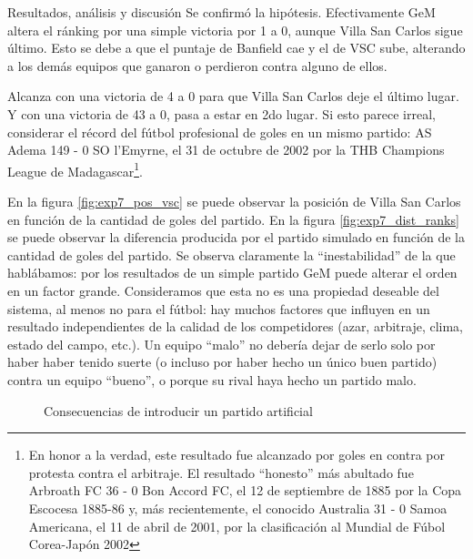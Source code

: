 \begin{LaTeXdescription}
    \item[Resultados, an\'alisis y discusi\'on]
        Se confirmó la hipótesis. Efectivamente GeM altera el ránking por una simple victoria por 1 a 0, aunque Villa San Carlos sigue último. Esto se debe a que el puntaje de Banfield cae y el de VSC sube, alterando a los demás equipos que ganaron o perdieron contra alguno de ellos.
        
        Alcanza con una victoria de 4 a 0 para que Villa San Carlos deje el último lugar. Y con una victoria de 43 a 0, pasa a estar en 2do lugar. Si esto parece irreal, considerar el récord del fútbol profesional de goles en un mismo partido: AS Adema 149 - 0 SO l'Emyrne, el 31 de octubre de 2002 por la THB Champions League de Madagascar\footnote{En honor a la verdad, este resultado fue alcanzado por goles en contra por protesta contra el arbitraje. El resultado ``honesto'' más abultado fue Arbroath FC 36 - 0 Bon Accord FC, el 12 de septiembre de 1885 por la Copa Escocesa 1885-86 y, más recientemente, el conocido Australia 31 - 0 Samoa Americana, el 11 de abril de 2001, por la clasificación al Mundial de Fúbol Corea-Japón 2002}.
        
        En la figura \ref{fig:exp7_pos_vsc} se puede observar la posición de Villa San Carlos en función de la cantidad de goles del partido. En la figura \ref{fig:exp7_dist_ranks} se puede observar la diferencia producida por el partido simulado en función de la cantidad de goles del partido. Se observa claramente la ``inestabilidad'' de la que hablábamos: por los resultados de un simple partido GeM puede alterar el orden en un factor grande. Consideramos que esta no es una propiedad deseable del sistema, al menos no para el fútbol: hay muchos factores que influyen en un resultado independientes de la calidad de los competidores (azar, arbitraje, clima, estado del campo, etc.). Un equipo ``malo'' no debería dejar de serlo solo por haber haber tenido suerte (o incluso por haber hecho un único buen partido) contra un equipo ``bueno'', o porque su rival haya hecho un partido malo.
\end{LaTeXdescription}

\begin{figure}[!h]
    \centering
    \caption{Consecuencias de introducir un partido artificial}
\end{figure}
\noindent

